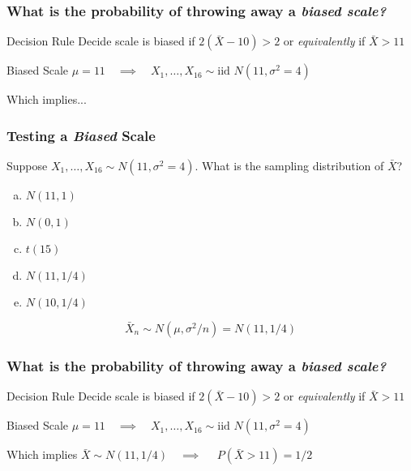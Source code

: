 \documentclass{beamer}
\begin{document}
\begin{frame}
	\frametitle{What is the probability of throwing away a \em{biased} scale?}

	\begin{block}
		{Decision Rule}
		Decide scale is biased if $2(\bar{X} - 10) > 2$ or \emph{equivalently} if \alert{$\bar{X} > 11$} 
	\end{block}
	\begin{block}
		{Biased Scale}
		$\mu = 11 \quad \implies \quad X_1, \hdots, X_{16} \sim \mbox{iid } N(11, \sigma^2 = 4)$
	\end{block}
	\begin{alertblock}
		{Which implies...}
	\end{alertblock}
\end{frame}
\begin{frame}
	\frametitle{Testing a \emph{Biased} Scale}

	Suppose $X_1, \hdots, X_{16} \sim N(11, \sigma^2 = 4)$. What is the sampling distribution of $\bar{X}$?
	
	\vspace{1em}

	\begin{enumerate}[(a)]
		\item $N(11, 1)$
		\item $N(0, 1)$ 
		\item $t(15)$
		\item $N(11, 1/4)$ 
		\item $N(10, 1/4)$
	\end{enumerate}
\pause

\vspace{1em}

\alert{$$\bar{X}_n \sim N(\mu, \sigma^2/n) = N(11, 1/4)$$}
\end{frame}
\begin{frame}
	\frametitle{What is the probability of throwing away a \em{biased} scale?}

	\begin{block}
		{Decision Rule}
		Decide scale is biased if $2(\bar{X} - 10) > 2$ or \emph{equivalently} if \alert{$\bar{X} > 11$} 
	\end{block}
	\begin{block}
		{Biased Scale}
		$\mu = 11 \quad \implies \quad X_1, \hdots, X_{16} \sim \mbox{iid } N(11, \sigma^2 = 4)$
	\end{block}
	\begin{alertblock}
		{Which implies}
		$\bar{X} \sim N(11, 1/4)\quad \implies \quad$  \alert{$P(\bar{X}>11) = 1/2$} 
	\end{alertblock}

\vspace{1em}

	\alert{}
\end{frame}
\end{document}

